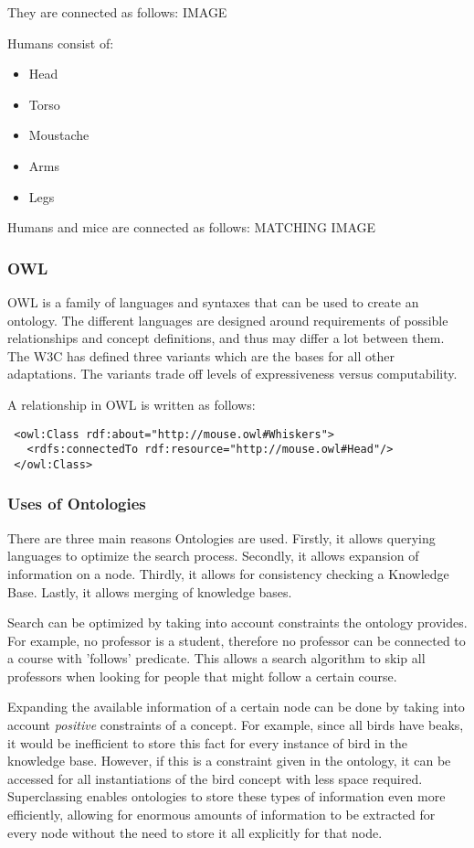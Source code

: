 \documentclass{article}
\begin{document}
 They are connected as follows: IMAGE
 
 Humans consist of:
 \begin{itemize}
 \item Head
 \item Torso
 \item Moustache
 \item Arms
 \item Legs
 \end{itemize} 
 
 Humans and mice are connected as follows: MATCHING IMAGE
 
 \subsubsection{OWL}
 OWL is a family of languages and syntaxes that can be used to create an ontology. The different languages are designed around requirements of possible relationships and concept definitions, and thus may differ a lot between them. The W3C has defined three variants which are the bases for all other adaptations. The variants trade off levels of expressiveness versus computability. %

 A relationship in OWL is written as follows:
 
 \lstset{language=XML}
 \begin{lstlisting}
 <owl:Class rdf:about="http://mouse.owl#Whiskers">
   <rdfs:connectedTo rdf:resource="http://mouse.owl#Head"/>
 </owl:Class>
 \end{lstlisting}
 
 \subsubsection{Uses of Ontologies}
 There are three main reasons Ontologies are used. Firstly, it allows querying languages to optimize the search process. Secondly, it allows expansion of information on a node. Thirdly, it allows for consistency checking a Knowledge Base. Lastly, it allows merging of knowledge bases.
 
 Search can be optimized by taking into account constraints the ontology provides. For example, no professor is a student, therefore no professor can be connected to a course with 'follows' predicate. This allows a search algorithm to skip all professors when looking for people that might follow a certain course.
 
 Expanding the available information of a certain node can be done by taking into account \textit{positive} constraints of a concept. For example, since all birds have beaks, it would be inefficient to store this fact for every instance of bird in the knowledge base. However, if this is a constraint given in the ontology, it can be accessed for all instantiations of the bird concept with less space required. Superclassing enables ontologies to store these types of information even more efficiently, allowing for enormous amounts of information to be extracted for every node without the need to store it all explicitly for that node.
 
\end{document}

